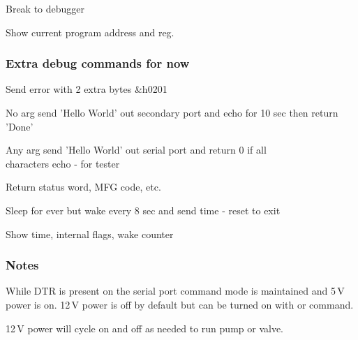  Break to debugger

 Show current program address and reg.


\subsubsection*{Extra debug commands for now}

 Send error  with 2 extra bytes \&h0201

 No arg send 'Hello World' out secondary port and echo for 10 sec then
return 'Done'

 Any arg send 'Hello World' out serial port and return 0 if all\\
characters echo - for tester

 Return status word, MFG code, etc.

 Sleep for ever but wake every 8 sec and send time - reset to exit

 Show time, internal flags, wake counter


\subsubsection*{Notes}

While DTR is present on the serial port command mode is maintained and 5\,V power is on. 12\,V power is off by default but can be turned on with  or  command.

12\,V power will cycle on and off as needed to run pump or valve.

